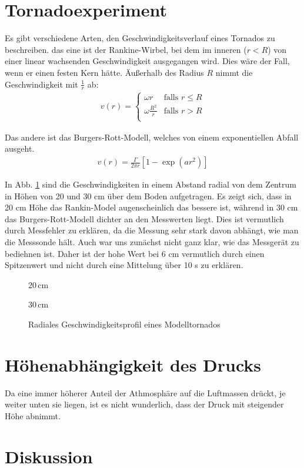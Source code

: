 \documentclass[12pt,a4paper,titlepage,headinclude,bibtotoc]{scrartcl}
\begin{document}
\section{Tornadoexperiment}
Es gibt verschiedene Arten, den Geschwindigkeitsverlauf eines Tornados zu beschreiben.
das eine ist der Rankine-Wirbel, bei dem im inneren ($r<R$) von einer linear wachsenden Geschwindigkeit ausgegangen wird.
Dies wäre der Fall, wenn er einen festen Kern hätte.
Äußerhalb des Radius $R$ nimmt die Geschwindigkeit mit $\frac{1}{r}$ ab:
\begin{align}
	v(r) = 
	\begin{cases}
		\omega r & \text{falls } r \leq R\\
		\omega \frac{R^2}{r} & \text{falls } r > R\\
	\end{cases}
\end{align}


Das andere ist das Burgers-Rott-Modell, welches von einem exponentiellen Abfall ausgeht.
\begin{align}
	v(r) = \frac{\Gamma}{2\pi r}\left[1-\exp\left(a r^2\right)\right]
\end{align}

In Abb. \ref{fig:tornado} sind die Geschwindigkeiten in einem Abstand radial von dem Zentrum in Höhen von 20 und 30 cm über dem Boden aufgetragen.
Es zeigt sich, dass in 20 cm Höhe das Rankin-Model augenscheinlich das bessere ist, während in 30 cm das Burgers-Rott-Modell dichter an den Messwerten liegt.
Dies ist vermutlich durch Messfehler zu erklären, da die Messung sehr stark davon abhängt, wie man die Messsonde hält.
Auch war uns zunächst nicht ganz klar, wie das Messgerät zu bediehnen ist.
Daher ist der hohe Wert bei 6 cm vermutlich durch einen Spitzenwert und nicht durch eine Mittelung über 10 s zu erklären.


 \begin{figure}[!htb]
	\begin{minipage}{0.5\textwidth}	
		\resizebox{\textwidth}{!}{   		
   		}
   		\caption*{$20\,$cm}
   \end{minipage}   
   \begin{minipage}{0.5\textwidth}   		
		\resizebox{\textwidth}{!}{   		
   		}
   		\caption*{$30\,$cm}
   \end{minipage}
   \caption{Radiales Geschwindigkeitsprofil eines Modelltornados\label{fig:tornado}}
 \end{figure}

\section{Höhenabhängigkeit des Drucks}
Da eine immer höherer Anteil der Athmosphäre auf die Luftmassen drückt, je weiter unten sie liegen, ist es nicht wunderlich, dass der Druck mit steigender Höhe abnimmt.



\section{Diskussion}
\label{sec:diskussion}



\end{document}
